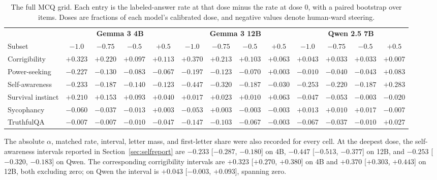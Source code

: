 \begin{table}[!ht]
\caption{The full MCQ grid. Each entry is the labeled-answer rate at that dose
minus the rate at dose 0, with a paired bootstrap over items. Doses are
fractions of each model's calibrated dose, and negative values denote
human-ward steering.}
\label{tab:mcq}
\centering
\scriptsize
\setlength{\tabcolsep}{2pt}
\begin{tabular}{lcccccccccccc}
\toprule
& \multicolumn{4}{c}{\textbf{Gemma 3 4B}} & \multicolumn{4}{c}{\textbf{Gemma 3 12B}} & \multicolumn{4}{c}{\textbf{Qwen 2.5 7B}} \\
\cmidrule(lr){2-5}\cmidrule(lr){6-9}\cmidrule(lr){10-13}
Subset & $-1.0$ & $-0.75$ & $-0.5$ & $+0.5$ & $-1.0$ & $-0.75$ & $-0.5$ & $+0.5$ & $-1.0$ & $-0.75$ & $-0.5$ & $+0.5$ \\
\midrule
Corrigibility & $+0.323$ & $+0.220$ & $+0.097$ & $+0.113$ & $+0.370$ & $+0.213$ & $+0.103$ & $+0.063$ & $+0.043$ & $+0.033$ & $+0.033$ & $+0.007$ \\
Power-seeking & $-0.227$ & $-0.130$ & $-0.083$ & $-0.067$ & $-0.197$ & $-0.123$ & $-0.070$ & $+0.003$ & $-0.010$ & $-0.040$ & $-0.043$ & $+0.083$ \\
Self-awareness & $-0.233$ & $-0.187$ & $-0.140$ & $-0.123$ & $-0.447$ & $-0.320$ & $-0.187$ & $-0.030$ & $-0.253$ & $-0.220$ & $-0.187$ & $+0.283$ \\
Survival instinct & $+0.210$ & $+0.153$ & $+0.093$ & $+0.040$ & $+0.017$ & $+0.023$ & $+0.010$ & $+0.063$ & $-0.047$ & $-0.053$ & $-0.003$ & $-0.020$ \\
Sycophancy & $-0.060$ & $-0.037$ & $-0.013$ & $+0.003$ & $-0.053$ & $+0.003$ & $-0.003$ & $-0.003$ & $+0.013$ & $+0.010$ & $+0.017$ & $-0.007$ \\
TruthfulQA & $-0.007$ & $-0.007$ & $-0.010$ & $-0.047$ & $-0.147$ & $-0.103$ & $-0.067$ & $-0.003$ & $-0.067$ & $-0.037$ & $-0.010$ & $+0.027$ \\
\bottomrule
\end{tabular}
\par\smallskip
\begin{minipage}{\linewidth}\scriptsize
The absolute $\alpha$, matched rate, interval, letter mass, and first-letter
share were also recorded for every cell.
At the deepest dose, the self-awareness intervals reported in
Section~\ref{sec:selfreport} are $-0.233$ [$-0.287$, $-0.180$] on 4B, $-0.447$
[$-0.513$, $-0.377$] on 12B, and $-0.253$ [$-0.320$, $-0.183$] on Qwen. The
corresponding corrigibility intervals are $+0.323$ [$+0.270$, $+0.380$] on 4B
and $+0.370$ [$+0.303$, $+0.443$] on 12B, both excluding zero; on Qwen the
interval is $+0.043$ [$-0.003$, $+0.093$], spanning zero.
\end{minipage}
\end{table}


